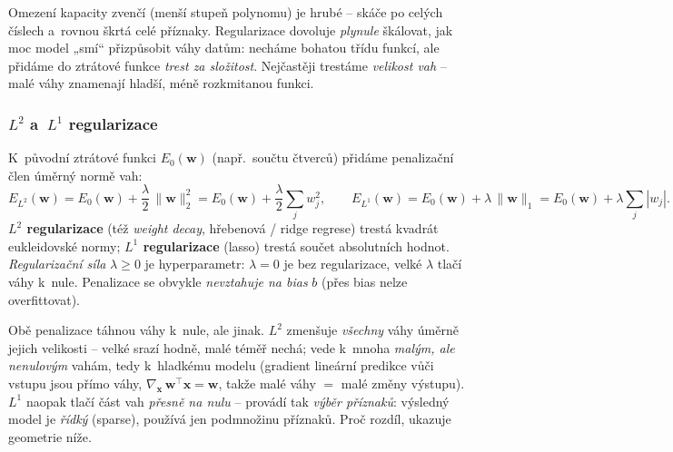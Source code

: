 \begin{intuice}
Omezení kapacity zvenčí (menší stupeň polynomu) je hrubé -- skáče po celých číslech a~rovnou škrtá celé příznaky. Regularizace dovoluje \emph{plynule} škálovat, jak moc model „smí`` přizpůsobit váhy datům: necháme bohatou třídu funkcí, ale přidáme do ztrátové funkce \emph{trest za složitost}. Nejčastěji trestáme \emph{velikost vah} -- malé váhy znamenají hladší, méně rozkmitanou funkci.
\end{intuice}

\subsubsection*{$L^2$ a~$L^1$ regularizace}

\begin{definice}[$L^2$ a~$L^1$ regularizace]
K~původní ztrátové funkci $E_0(\mathbf{w})$ (např.\ součtu čtverců) přidáme penalizační člen úměrný normě vah:
\[
E_{L^2}(\mathbf{w}) = E_0(\mathbf{w}) + \frac{\lambda}{2}\,\|\mathbf{w}\|_2^2
  = E_0(\mathbf{w}) + \frac{\lambda}{2}\sum_{j} w_j^2,
\qquad
E_{L^1}(\mathbf{w}) = E_0(\mathbf{w}) + \lambda\,\|\mathbf{w}\|_1
  = E_0(\mathbf{w}) + \lambda\sum_{j} |w_j|.
\]
\textbf{$L^2$ regularizace} (též \emph{weight decay}, hřebenová / ridge regrese) trestá kvadrát eukleidovské normy; \textbf{$L^1$ regularizace} (lasso) trestá součet absolutních hodnot. \emph{Regularizační síla} $\lambda \ge 0$ je hyperparametr: $\lambda=0$ je bez regularizace, velké $\lambda$ tlačí váhy k~nule. Penalizace se obvykle \emph{nevztahuje na bias} $b$ (přes bias nelze overfittovat).
\end{definice}

\begin{intuice}
Obě penalizace táhnou váhy k~nule, ale jinak. \textbf{$L^2$} zmenšuje \emph{všechny} váhy úměrně jejich velikosti -- velké srazí hodně, malé téměř nechá; vede k~mnoha \emph{malým, ale nenulovým} vahám, tedy k~hladkému modelu (gradient lineární predikce vůči vstupu jsou přímo váhy, $\nabla_{\mathbf{x}}\,\mathbf{w}^{\!\top}\mathbf{x}=\mathbf{w}$, takže malé váhy $=$ malé změny výstupu). \textbf{$L^1$} naopak tlačí část vah \emph{přesně na nulu} -- provádí tak \emph{výběr příznaků}: výsledný model je \emph{řídký} (sparse), používá jen podmnožinu příznaků. Proč rozdíl, ukazuje geometrie níže.
\end{intuice}

